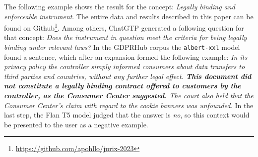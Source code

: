 The following example shows the result for the concept: \textit{Legally binding and enforceable instrument}. The entire data and results described in this paper can be found on Github\footnote{\url{https://github.com/apohllo/jurix-2023}}.
Among others, ChatGTP generated a following question for that concept: \textit{Does the instrument in
question meet the criteria for being legally binding under relevant laws?}
In the GDPRHub corpus the \texttt{albert-xxl} model found a sentence, which after an expansion formed
the following example: \textit{In its privacy policy the controller simply
informed consumers about data transfers to third parties and countries, without
any further legal effect.  \textbf{This document did not constitute a legally binding
contract offered to customers by the controller, as the Consumer Center
suggested.} The court also held that the Consumer Center's claim with regard to
the cookie banners was unfounded.} In the last step, the Flan T5 model judged that the
answer is \textit{no}, so this context would be presented to the user as a
negative example.
